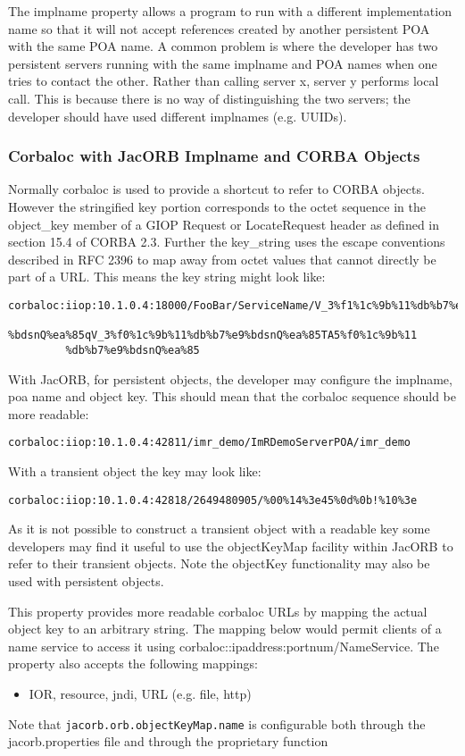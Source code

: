The implname property allows a program to run with a different implementation name so that it will not accept references created by another persistent POA with the same POA name. A common problem is where the developer has two persistent servers running with the same implname and POA names when one tries to contact the other. Rather than calling server x, server y performs local call. This is because there is no way of distinguishing the two servers; the developer should have used different implnames (e.g. UUIDs).

\subsubsection{Corbaloc with JacORB Implname and CORBA Objects}

Normally corbaloc is used to provide a shortcut to refer to CORBA objects. However the stringified key portion corresponds to the octet sequence in the object\_key member of a GIOP Request or LocateRequest header as defined in section 15.4 of CORBA 2.3. Further the key\_string uses the escape conventions described in RFC 2396 to map away from octet values that cannot directly be part of a URL. This means the key string might look like:
\small{
\begin{verbatim}
corbaloc:iiop:10.1.0.4:18000/FooBar/ServiceName/V_3%f1%1c%9b%11%db%b7%e9
         %bdsnQ%ea%85qV_3%f0%1c%9b%11%db%b7%e9%bdsnQ%ea%85TA5%f0%1c%9b%11
         %db%b7%e9%bdsnQ%ea%85
\end{verbatim}
}
With JacORB, for persistent objects, the developer may configure the implname, poa name and object key. This should mean that the corbaloc sequence should be more readable:
\small{
\begin{verbatim}
corbaloc:iiop:10.1.0.4:42811/imr_demo/ImRDemoServerPOA/imr_demo
\end{verbatim}
}
With a transient object the key may look like:
\small{
\begin{verbatim}
corbaloc:iiop:10.1.0.4:42818/2649480905/%00%14%3e45%0d%0b!%10%3e
\end{verbatim}
}
As it is not possible to construct a transient object with a readable key some developers may find it useful to use the objectKeyMap facility within JacORB to refer to their transient objects. Note the objectKey functionality may also be used with persistent objects.

This property provides more readable corbaloc URLs by mapping the actual object key to an arbitrary string. The mapping below would permit clients of a name service to access it using corbaloc::ipaddress:portnum/NameService. The property also accepts the following mappings:
\begin{itemize}
\item IOR, resource, jndi, URL (e.g. file, http)
\end{itemize}
Note that {\tt jacorb.orb.objectKeyMap.name} is configurable both through the jacorb.properties file and through the proprietary function

